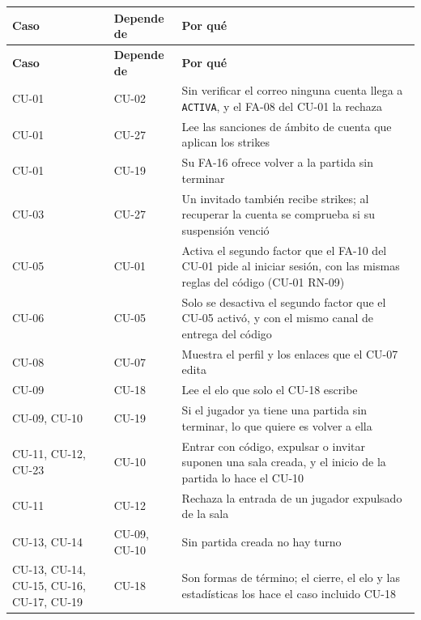 \begin{center}\small
\begin{longtable}{|L{0.155\textwidth}|L{0.170\textwidth}|L{0.555\textwidth}|}
\hline
\textbf{Caso} & \textbf{Depende de} & \textbf{Por qué} \\ \hline
\endfirsthead
\hline
\textbf{Caso} & \textbf{Depende de} & \textbf{Por qué} \\ \hline
\endhead
\mbox{CU-01} & \mbox{CU-02} & Sin verificar el correo ninguna cuenta llega a \texttt{ACTIVA}, y el \mbox{FA-08} del \mbox{CU-01} la rechaza \\ \hline
\mbox{CU-01} & \mbox{CU-27} & Lee las sanciones de ámbito de cuenta que aplican los strikes \\ \hline
\mbox{CU-01} & \mbox{CU-19} & Su \mbox{FA-16} ofrece volver a la partida sin terminar \\ \hline
\mbox{CU-03} & \mbox{CU-27} & Un invitado también recibe strikes; al recuperar la cuenta se comprueba si su suspensión venció \\ \hline
\mbox{CU-05} & \mbox{CU-01} & Activa el segundo factor que el \mbox{FA-10} del \mbox{CU-01} pide al iniciar sesión, con las mismas reglas del código (\mbox{CU-01} \mbox{RN-09}) \\ \hline
\mbox{CU-06} & \mbox{CU-05} & Solo se desactiva el segundo factor que el \mbox{CU-05} activó, y con el mismo canal de entrega del código \\ \hline
\mbox{CU-08} & \mbox{CU-07} & Muestra el perfil y los enlaces que el \mbox{CU-07} edita \\ \hline
\mbox{CU-09} & \mbox{CU-18} & Lee el elo que solo el \mbox{CU-18} escribe \\ \hline
\mbox{CU-09}, \mbox{CU-10} & \mbox{CU-19} & Si el jugador ya tiene una partida sin terminar, lo que quiere es volver a ella \\ \hline
\mbox{CU-11}, \mbox{CU-12}, \mbox{CU-23} & \mbox{CU-10} & Entrar con código, expulsar o invitar suponen una sala creada, y el inicio de la partida lo hace el \mbox{CU-10} \\ \hline
\mbox{CU-11} & \mbox{CU-12} & Rechaza la entrada de un jugador expulsado de la sala \\ \hline
\mbox{CU-13}, \mbox{CU-14} & \mbox{CU-09}, \mbox{CU-10} & Sin partida creada no hay turno \\ \hline
\mbox{CU-13}, \mbox{CU-14}, \mbox{CU-15}, \mbox{CU-16}, \mbox{CU-17}, \mbox{CU-19} & \mbox{CU-18} & Son formas de término; el cierre, el elo y las estadísticas los hace el caso incluido \mbox{CU-18} \\ \hline

\end{longtable}
\end{center}
